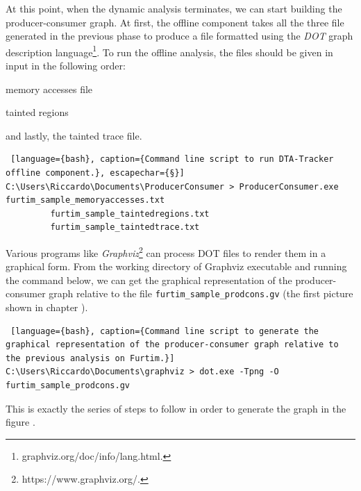 \documentclass[LaM,binding=0.6cm]{sapthesis}
\begin{document}
At this point, when the dynamic analysis terminates, we can start building the producer-consumer graph. At first, the offline component takes all the three file generated in the previous phase to produce a file formatted using the \textit{DOT} graph description language\footnote{graphviz.org/doc/info/lang.html.}. To run the offline analysis, the files should be given in input in the following order:
\begin{enumerate*}[label=\roman*),itemjoin={,\quad}]
\item memory accesses file
\item tainted regions 
\item and lastly, the tainted trace file.\\
\end{enumerate*}
\begin{lstlisting} [language={bash}, caption={Command line script to run DTA-Tracker offline component.}, escapechar={§}]
C:\Users\Riccardo\Documents\ProducerConsumer > ProducerConsumer.exe furtim_sample_memoryaccesses.txt 
		 furtim_sample_taintedregions.txt 
		 furtim_sample_taintedtrace.txt
\end{lstlisting}
Various programs like \textit{Graphviz}\footnote{https://www.graphviz.org/.} can process DOT files to render them in a graphical form. From the working directory of Graphviz executable and running the command below, we can get the graphical representation of the producer-consumer graph relative to the file \texttt{furtim\_sample\_prodcons.gv} (the first picture shown in chapter ).
\begin{lstlisting} [language={bash}, caption={Command line script to generate the graphical representation of the producer-consumer graph relative to the previous analysis on Furtim.}]
C:\Users\Riccardo\Documents\graphviz > dot.exe -Tpng -O furtim_sample_prodcons.gv
\end{lstlisting}
This is exactly the series of steps to follow in order to generate the graph in the figure .\\ 
\end{document}

